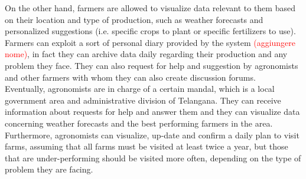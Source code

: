 On the other hand, farmers are allowed to visualize data relevant to them based on their location and type of production, such as weather forecasts and personalized suggestions (i.e. specific crops to plant or specific fertilizers to use). Farmers can exploit a sort of personal diary provided by the system \textcolor{red}{(aggiungere nome)}, in fact they can archive data daily regarding their production and any problem they face. They can also request for help and suggestion by agronomists and other farmers with whom they can also create discussion forums.\\

Eventually, agronomists are in charge of a certain mandal, which is a local government area and administrative division of Telangana. They can receive information about requests for help and answer them and they can visualize data concerning weather forecasts and the best performing farmers in the area. Furthermore, agronomists can visualize, up-date and confirm a daily plan to visit farms, assuming that all farms must be visited at least twice a year, but those that are under-performing should be visited more often, depending on the type of problem they are facing.


